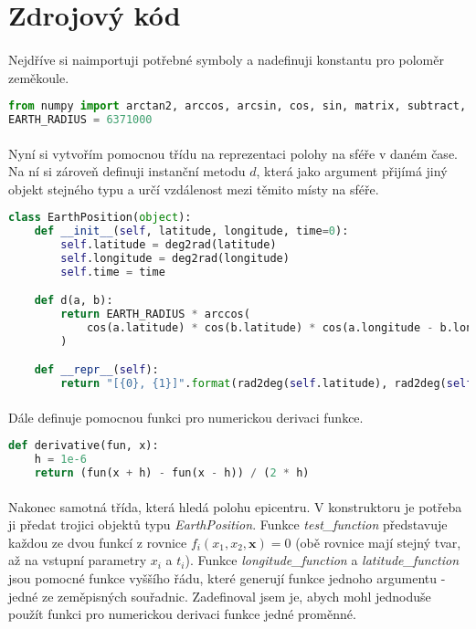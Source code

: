 \documentclass{article}
\begin{document}
    \section{Zdrojový kód}
    \paragraph{} Nejdříve si naimportuji potřebné symboly a nadefinuji konstantu pro poloměr zeměkoule.

    \begin{lstlisting}[language=Python]
from numpy import arctan2, arccos, arcsin, cos, sin, matrix, subtract, deg2rad, rad2deg, multiply, sqrt
EARTH_RADIUS = 6371000\end{lstlisting}

    \paragraph{} Nyní si vytvořím pomocnou třídu na reprezentaci polohy na sféře v daném čase. Na
    ní si zároveň definuji instanční metodu $d$, která jako argument přijímá jiný objekt stejného
    typu a určí vzdálenost mezi těmito místy na sféře.

    \begin{lstlisting}[language=Python]
class EarthPosition(object):
    def __init__(self, latitude, longitude, time=0):
        self.latitude = deg2rad(latitude)
        self.longitude = deg2rad(longitude)
        self.time = time

    def d(a, b):
        return EARTH_RADIUS * arccos(
            cos(a.latitude) * cos(b.latitude) * cos(a.longitude - b.longitude) + sin(a.latitude) * sin(b.latitude)
        )

    def __repr__(self):
        return "[{0}, {1}]".format(rad2deg(self.latitude), rad2deg(self.longitude))\end{lstlisting}

    \paragraph{} Dále definuje pomocnou funkci pro numerickou derivaci funkce.

    \begin{lstlisting}[language=Python]
def derivative(fun, x):
    h = 1e-6
    return (fun(x + h) - fun(x - h)) / (2 * h)\end{lstlisting}

    \paragraph{} Nakonec samotná třída, která hledá polohu epicentru. V konstruktoru je
        potřeba ji předat trojici objektů typu \textit{EarthPosition}. Funkce
        \textit{test\_function} představuje každou ze dvou funkcí z rovnice
        $f_i(x_1, x_2, \mathbf{x}) = 0$ (obě rovnice mají stejný
        tvar, až na vstupní parametry $x_i$ a $t_i$). Funkce \textit{longitude\_function} a 
        \textit{latitude\_function} jsou pomocné funkce vyššího řádu, které generují funkce
        jednoho argumentu - jedné ze zeměpisných souřadnic. Zadefinoval jsem je, abych mohl
        jednoduše použít funkci pro numerickou derivaci funkce jedné proměnné.
\end{document}
